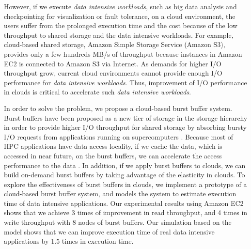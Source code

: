 However, if we execute \emph{data intensive workloads}, such as big data
analysis and checkpointing for visualization or fault tolerance, on a cloud environment, the
users suffer from the prolonged execution time and the cost because of the low
throughput to shared storage and the data intensive workloads.
For example, cloud-based shared storage, Amazon Simple Storage Service (Amazon
S3), provides only a few hundreds MB/s of throughput because instances
in Amazon EC2 is connected to Amazon S3 via Internet.
As demands for higher I/O throughput grow, 
current cloud environments cannot provide enough I/O performance for 
\emph{data intensive workloads}.
Thus, improvement of I/O performance in clouds is critical to accelerate such
\emph{data intensive workloads}.
\par
In order to solve the problem, we propose a cloud-based burst buffer system.
Burst buffers have been proposed as a new tier of storage in the storage
hierarchy in order to provide higher I/O throughput for shared storage by
absorbing bursty I/O requests from applications running on supercomputers
\cite{on_the_role_of_burst_buffers}.
Because most of HPC applications have data access
locality, if we cache the data, which is accessed in near future, on the burst
buffers, we can accelerate the access performance to the data
\cite{montage,povray}.
In addition, if we apply burst buffers to clouds, we can build on-demand burst
buffers by taking advantage of the elasticity in clouds. 
To explore the effectiveness of burst buffers in clouds, 
we implement a prototype of a cloud-based burst buffer system, and models the
system to estimate execution time of data intensive applications.
Our experimental results using Amazon EC2 shows that we achieve 3 times of
improvement in read throughput, and 4 times in write throughput with 8 nodes of
burst buffers. Our simulation based on the model shows that we can
improve execution time of real data intensive applications by 1.5 times in execution time.
\par



